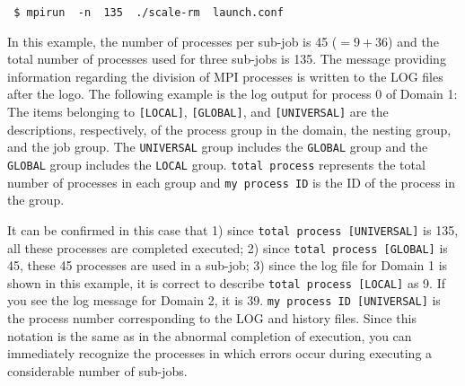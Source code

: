 \begin{verbatim}
 $ mpirun  -n  135  ./scale-rm  launch.conf
\end{verbatim}
In this example, the number of processes per sub-job is 45 ($=9 + 36$) and the total number of processes used for three sub-jobs is 135. The message providing information regarding the division of MPI processes is written to the LOG files after the \scalelib logo. The following example is the log output for process 0 of Domain 1:
The items belonging to \verb|[LOCAL]|, \verb|[GLOBAL]|, and \verb|[UNIVERSAL]| are the descriptions, respectively, of the process group in the domain, the nesting group, and the job group. The \verb|UNIVERSAL| group includes the \verb|GLOBAL| group and the \verb|GLOBAL| group includes the \verb|LOCAL| group. \verb|total process| represents the total number  of processes in each group and \verb|my process ID| is the ID of the process in the group.

It can be confirmed in this case that 1) since \verb|total process [UNIVERSAL]| is 135, all these processes are completed executed; 2) since \verb|total process [GLOBAL]| is 45, these 45 processes are used in a sub-job; 3) since the log file for Domain 1 is shown in this example, it is correct to describe \verb|total process [LOCAL]| as 9. If you see the log message for Domain 2,  it is 39. \verb|my process ID [UNIVERSAL]| is the process number  corresponding to the LOG and history files. Since this notation is the same as in the abnormal completion of execution, you can immediately recognize the processes in which errors occur during executing a considerable number of sub-jobs.



